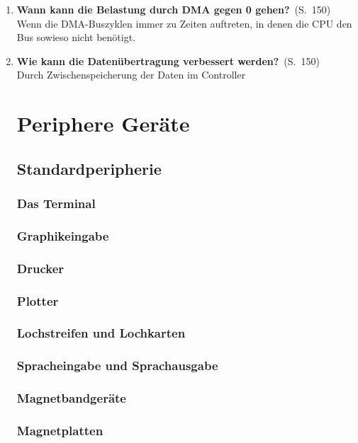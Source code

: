 \documentclass[a4paper,12pt]{article}
\newcommand{\question}[3]{\pagebreak[3]\item {\textbf{#1?}}\ (S.\ #2)#3}
\newcommand{\normaltext}[1]{\\#1}
\newcommand{\page}[1]{#1}
\begin{document}
\begin{enumerate}
  \question{Wann kann die Belastung durch DMA gegen 0 gehen}{\page{150}}
  {
    \normaltext{Wenn die DMA-Buszyklen immer zu Zeiten auftreten, in denen die CPU den Bus
                sowieso nicht benötigt.}
  }

  \question{Wie kann die Datenübertragung verbessert werden}{\page{150}}
  {
    \normaltext{Durch Zwischenspeicherung der Daten im Controller}
  }

  \newpage
  \section{Periphere Geräte}

  \subsection{Standardperipherie}

  \subsubsection{Das Terminal}

  \subsubsection{Graphikeingabe}

  \subsubsection{Drucker}

  \subsubsection{Plotter}

  \subsubsection{Lochstreifen und Lochkarten}

  \subsubsection{Spracheingabe und Sprachausgabe}

  \subsubsection{Magnetbandgeräte}

  \subsubsection{Magnetplatten}


\end{enumerate}
\end{document}
